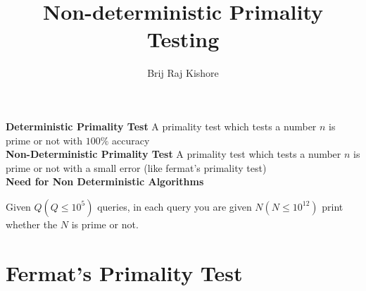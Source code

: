 \documentclass[12pt]{article}
\title{Non-deterministic Primality Testing}
\date{}
\author{Brij Raj Kishore}
\begin{document}
    \maketitle
    \textbf{Deterministic Primality Test}
    A primality test which tests a number $n$ is prime or not with $100 \%$ accuracy \\

    \textbf{Non-Deterministic Primality Test} A primality test which tests a number $n$ is prime or not with a small error (like fermat's primality test) \\




    \textbf{Need for Non Deterministic Algorithms}

    Given $Q (Q \leq 10^5)$ queries, in each query you are given $N (N \leq 10^{12})$ print whether the $N$ is prime or not.

    \section{Fermat's Primality Test}

    
\end{document}
